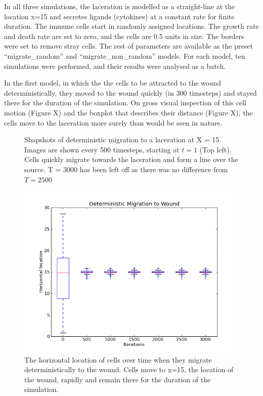 \documentclass[12pt]{article}
\begin{document}
In all three simulations, the laceration is modelled as a straight-line 
at the location x=15 and secretes ligands (cytokines) at a constant rate 
for finite duration. The immune cells start in randomly assigned 
locations. The growth rate and death rate are set to zero, and the cells 
are 0.5 units in size. The borders were set to remove stray cells. The 
rest of parameters are available as the preset ``migrate\_random'' and 
``migrate\_non\_random'' models. For each model, ten simulations were 
performed, and their results were analysed as a batch.

In the first model, in which the the cells to be attracted to the wound 
deterministically, they moved to the wound quickly (in 300 timesteps) 
and stayed there for the duration of the simulation. On gross visual 
inspection of this cell motion (Figure X) and the boxplot that describes 
their distance (Figure X), the cells move to the laceration more surely 
than would be seen in nature.

\begin{figure}[H]
\centering
\caption{Shapshots of deterministic 
migration to a laceration at X = 15. Images are shown every 500 timesteps, 
starting at \(t = 1\) (Top left). Cells quickly migrate towards the laceration and 
form a line over the source. T = 3000 has been left off as there was no 
difference from \(T = 2500\)}
\end{figure}

\begin{figure}[H]
\centering
\includegraphics[width=11.51cm]{media/DetMigrationtoWound.png}
\caption{The horizontal location of cells over time when 
they migrate deterministically to the wound. Cells move to x=15, the 
location of the wound, rapidly and remain there for the duration of the 
simulation.}
\end{figure}
\end{document}
